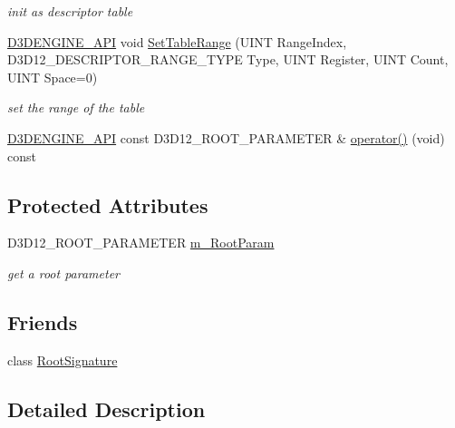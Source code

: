 \begin{DoxyCompactItemize}
\begin{DoxyCompactList}\small\item\em init as descriptor table \end{DoxyCompactList}\item 
\mbox{\hyperlink{stdafx_8h_a8ee2d990c5dfba7794dd2b60741d7722}{D3\+D\+E\+N\+G\+I\+N\+E\+\_\+\+A\+PI}} void \mbox{\hyperlink{class_root_parameter_a7a5cec715dd1b0e5f4b728b42ed80257}{Set\+Table\+Range}} (U\+I\+NT Range\+Index, D3\+D12\+\_\+\+D\+E\+S\+C\+R\+I\+P\+T\+O\+R\+\_\+\+R\+A\+N\+G\+E\+\_\+\+T\+Y\+PE Type, U\+I\+NT Register, U\+I\+NT Count, U\+I\+NT Space=0)
\begin{DoxyCompactList}\small\item\em set the range of the table \end{DoxyCompactList}\item 
\mbox{\hyperlink{stdafx_8h_a8ee2d990c5dfba7794dd2b60741d7722}{D3\+D\+E\+N\+G\+I\+N\+E\+\_\+\+A\+PI}} const D3\+D12\+\_\+\+R\+O\+O\+T\+\_\+\+P\+A\+R\+A\+M\+E\+T\+ER \& \mbox{\hyperlink{class_root_parameter_a8fbdf81ff58ae44320e6f3f43f4eac82}{operator()}} (void) const
\end{DoxyCompactItemize}
\subsection*{Protected Attributes}
\begin{DoxyCompactItemize}
\item 
D3\+D12\+\_\+\+R\+O\+O\+T\+\_\+\+P\+A\+R\+A\+M\+E\+T\+ER \mbox{\hyperlink{class_root_parameter_a66f26d4bb3cd092c625bc083c508fe40}{m\+\_\+\+Root\+Param}}
\begin{DoxyCompactList}\small\item\em get a root parameter \end{DoxyCompactList}\end{DoxyCompactItemize}
\subsection*{Friends}
\begin{DoxyCompactItemize}
\item 
class \mbox{\hyperlink{class_root_parameter_a7e2ac7a0f943c9d42c25946d63339943}{Root\+Signature}}
\end{DoxyCompactItemize}


\subsection{Detailed Description}


